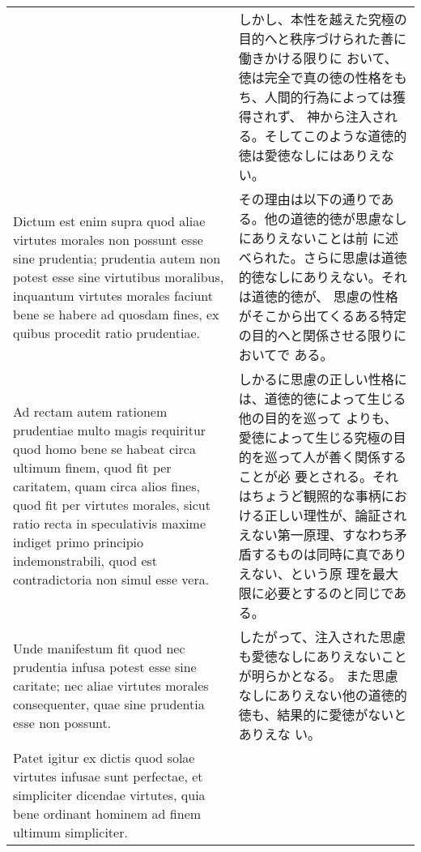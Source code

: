 \documentclass[10pt]{jsarticle}
\begin{document}
\begin{longtable}{p{21em}p{21em}}
&

 しかし、本性を越えた究極の目的へと秩序づけられた善に働きかける限りに
 おいて、徳は完全で真の徳の性格をもち、人間的行為によっては獲得されず、
 神から注入される。そしてこのような道徳的徳は愛徳なしにはありえない。

\\

 Dictum est enim supra quod aliae virtutes morales non
 possunt esse sine prudentia; prudentia autem non potest esse sine
 virtutibus moralibus, inquantum virtutes morales faciunt bene se
 habere ad quosdam fines, ex quibus procedit ratio prudentiae.
 
&

その理由は以下の通りである。他の道徳的徳が思慮なしにありえないことは前
に述べられた。さらに思慮は道徳的徳なしにありえない。それは道徳的徳が、
思慮の性格がそこから出てくるある特定の目的へと関係させる限りにおいてで
ある。


\\

 Ad rectam autem rationem prudentiae multo magis requiritur quod homo
 bene se habeat circa ultimum finem, quod fit per caritatem, quam
 circa alios fines, quod fit per virtutes morales, sicut ratio recta
 in speculativis maxime indiget primo principio indemonstrabili, quod
 est contradictoria non simul esse vera.
 
&

 しかるに思慮の正しい性格には、道徳的徳によって生じる他の目的を巡って
 よりも、愛徳によって生じる究極の目的を巡って人が善く関係することが必
 要とされる。それはちょうど観照的な事柄における正しい理性が、論証され
 えない第一原理、すなわち矛盾するものは同時に真でありえない、という原
 理を最大限に必要とするのと同じである。
 
\\

 Unde manifestum fit quod nec
 prudentia infusa potest esse sine caritate; nec aliae virtutes
 morales consequenter, quae sine prudentia esse non possunt.

 
&

 したがって、注入された思慮も愛徳なしにありえないことが明らかとなる。
 また思慮なしにありえない他の道徳的徳も、結果的に愛徳がないとありえな
 い。

\\


 Patet igitur ex dictis quod solae virtutes infusae sunt perfectae, et
 simpliciter dicendae virtutes, quia bene ordinant hominem ad finem
 ultimum simpliciter.
 

\end{longtable}
\end{document}

